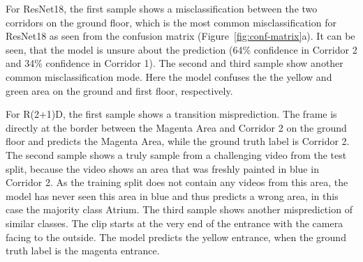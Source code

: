 \documentclass[a4paper]{article}
\begin{document}
For ResNet18, the first sample shows a misclassification between the two
corridors on the ground floor, which is the most common misclassification for
ResNet18 as seen from the confusion matrix (Figure~\ref{fig:conf-matrix}a). It
can be seen, that the model is unsure about the prediction (64\% confidence in
Corridor 2 and 34\% confidence in Corridor 1). The second and third sample
show another common misclassification mode. Here the model confuses the 
the yellow and green area on the ground and first floor, respectively.

For R(2+1)D, the first sample shows a transition misprediction. The frame is
directly at the border between the Magenta Area and Corridor 2 on the ground
floor and predicts the Magenta Area, while the ground truth label is Corridor
2. The second sample shows a truly sample from a challenging video from the
test split, because the video shows an area that was freshly painted in blue
in Corridor 2. As the training split does not contain any videos from this
area, the model has never seen this area in blue and thus predicts a wrong
area, in this case the majority class Atrium. The third sample shows another 
misprediction of similar classes. The clip starts at the very end of the
entrance with the camera facing to the outside. The model predicts the yellow
entrance, when the ground truth label is the magenta entrance.
\end{document}
